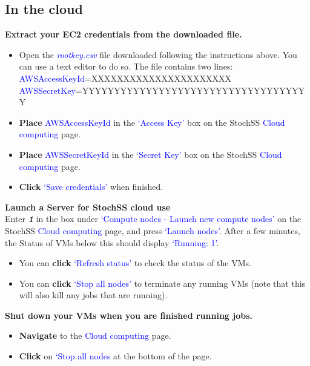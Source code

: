 \subsection{In the cloud}
\textbf{Extract your EC2 credentials from the downloaded file.}
\begin{itemize}
\item Open the \textcolor{blue}{\textit{rootkey.csv}} file downloaded following the instructions above. You can use a text editor to do so. The file contains two lines:\\
\textcolor{blue}{AWSAccessKeyId}=XXXXXXXXXXXXXXXXXXXXXX \\
\textcolor{blue}{AWSSecretKey}=YYYYYYYYYYYYYYYYYYYYYYYYYYYYYYYYYYYY
\item \textbf{Place} \textcolor{blue}{AWSAccessKeyId} in the \textcolor{blue}{`Access Key'} box on the StochSS \textcolor{blue}{Cloud computing} page.
\item \textbf{Place} \textcolor{blue}{AWSSecretKeyId} in the \textcolor{blue}{`Secret Key'} box on the StochSS \textcolor{blue}{Cloud computing} page.
\item \textbf{Click} \textcolor{blue}{`Save credentials'} when finished.
\end{itemize}
\textbf{Launch a Server for StochSS cloud use}\\
Enter \textbf{\textit{1}} in the box under \textcolor{blue}{`Compute nodes - Launch new compute nodes'} on the StochSS \textcolor{blue}{Cloud computing} page, and press \textcolor{blue}{`Launch nodes'}. After a few minutes, the Status of VMs below this should display \textcolor{blue}{`Running: 1'}.
\begin{itemize}
\item You can \textbf{click} \textcolor{blue}{`Refresh status'} to check the status of the VMs.
\item You can \textbf{click} \textcolor{blue}{`Stop all nodes'} to terminate any running VMs (note that this will also kill any jobs that are running).
\end{itemize}
\textbf{Shut down your VMs when you are finished running jobs.}
\begin{itemize}
\item \textbf{Navigate} to the \textcolor{blue}{Cloud computing} page.
\item \textbf{Click} on \textcolor{blue}{`Stop all nodes} at the bottom of the page.
\end{itemize}


